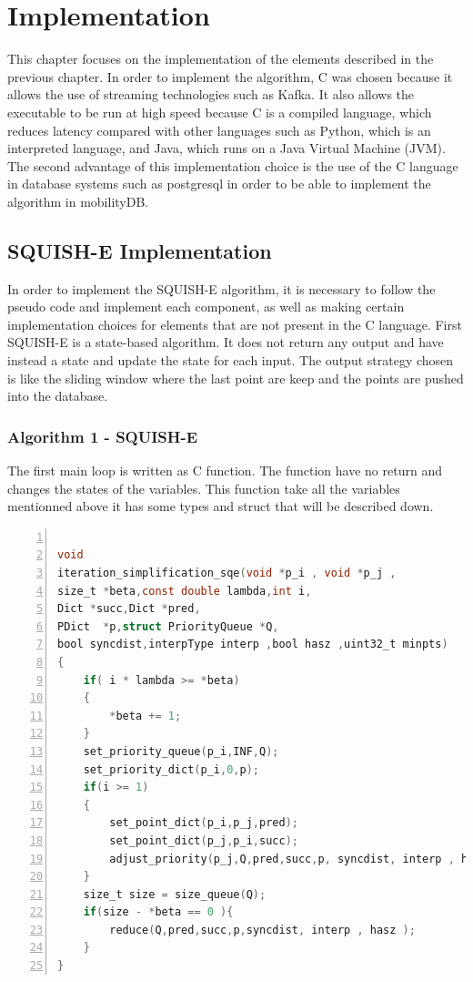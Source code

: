 
\chapter{Implementation}
This chapter focuses on the implementation of the elements described in the previous chapter. In order to implement the algorithm, C was chosen because it allows the use of streaming technologies such as Kafka. It also allows the executable to be run at high speed because C is a compiled language, which reduces latency compared with other languages such as Python, which is an interpreted language, and Java, which runs on a Java Virtual Machine (JVM). The second advantage of this implementation choice is the use of the C language in database systems such as postgresql in order to be able to implement the algorithm in mobilityDB.  

\section{SQUISH-E Implementation}
In order to implement the SQUISH-E algorithm, it is necessary to follow the pseudo code and implement each component, as well as making certain implementation choices for elements that are not present in the C language. First SQUISH-E is a state-based algorithm. It does not return any output and have instead a state and update the state for each input. The output strategy chosen is like the sliding window where the last point are keep and the points are pushed into the database. 

\subsection{Algorithm 1 - SQUISH-E}

The first main loop is written as C function. The function have no return and changes the states of the variables.  This function take all the variables mentionned above it has some types and struct that will be described down. 


\begin{minipage}{\linewidth}
\begin{lstlisting}[language=C, % Spécifie le langage du code
caption={SQUISH-E}, % Légende du listing
label=lst:squish_c, % Étiquette pour référencer le listing
numbers=left,
numberstyle=\tiny\color{gray},
stepnumber=1,
frame=single,
breaklines=true,
postbreak=\mbox{\textcolor{red}{$\hookrightarrow$}\space},
showstringspaces=false
]

void
iteration_simplification_sqe(void *p_i , void *p_j ,
size_t *beta,const double lambda,int i,
Dict *succ,Dict *pred,
PDict  *p,struct PriorityQueue *Q,
bool syncdist,interpType interp ,bool hasz ,uint32_t minpts)
{
	if( i * lambda >= *beta)
	{
		*beta += 1;
	}
	set_priority_queue(p_i,INF,Q);
	set_priority_dict(p_i,0,p);
	if(i >= 1)
	{
		set_point_dict(p_i,p_j,pred);
		set_point_dict(p_j,p_i,succ);
		adjust_priority(p_j,Q,pred,succ,p, syncdist, interp , hasz );
	}
	size_t size = size_queue(Q);
	if(size - *beta == 0 ){
		reduce(Q,pred,succ,p,syncdist, interp , hasz );
	}
}
\end{lstlisting}
 
\end{minipage}

